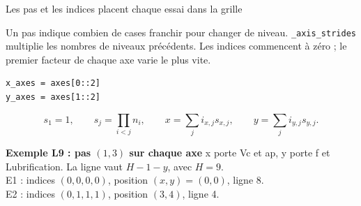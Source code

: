 \begin{frame}[t,fragile]{Les pas et les indices placent chaque essai dans la grille}
\vfill
{
Un pas indique combien de cases franchir pour changer de niveau. \texttt{\_axis\_strides} multiplie les nombres de niveaux précédents. Les indices commencent à zéro ; le premier facteur de chaque axe varie le plus vite.
\begin{lstlisting}[style=py_style1,numbers=none,basicstyle=\ttfamily\footnotesize,xleftmargin=0pt,breakatwhitespace=false,breakindent=0pt,keepspaces=true,breaklines=true,linewidth=0.98\linewidth]
x_axes = axes[0::2]
y_axes = axes[1::2]
\end{lstlisting}
\[
s_1=1,\qquad s_j=\prod_{i<j}n_i,\qquad
x=\sum_j i_{x,j}s_{x,j},\qquad y=\sum_j i_{y,j}s_{y,j}.
\]
\begin{mybox3}{\textbf{Exemple L9 : pas $(1,3)$ sur chaque axe}}
x porte Vc et ap, y porte f et Lubrification. La ligne vaut $H-1-y$, avec $H=9$.\\
E1 : indices $(0,0,0,0)$, position $(x,y)=(0,0)$, ligne 8.\\
E2 : indices $(0,1,1,1)$, position $(3,4)$, ligne 4.
\end{mybox3}}
\vfill
\end{frame}

